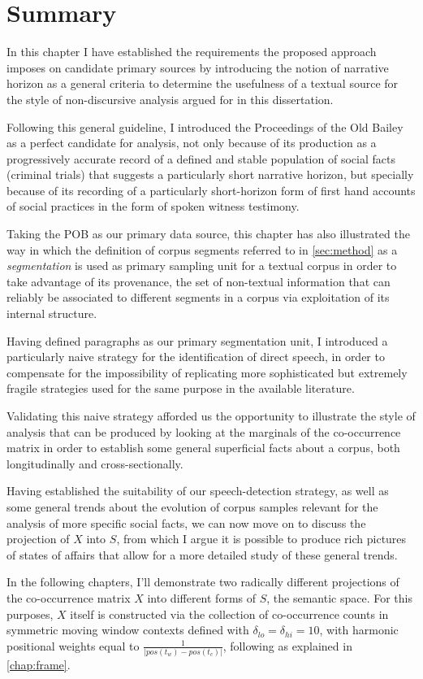 \section{Summary}

In this chapter I have established the requirements the proposed approach imposes on candidate primary sources by introducing the notion of narrative horizon as a general criteria to determine the usefulness of a textual source for the style of non-discursive analysis argued for in this dissertation.

Following this general guideline, I introduced the Proceedings of the Old Bailey as a perfect candidate for analysis, not only because of its production as a progressively accurate record of a defined and stable population of social facts (criminal trials) that suggests a particularly short narrative horizon, but specially because of its recording of a particularly short-horizon form of first hand accounts of social practices in the form of spoken witness testimony.

Taking the POB as our primary data source, this chapter has also illustrated the way in which the definition of corpus segments referred to in \autoref{sec:method} as a \emph{segmentation} is used as primary sampling unit for a textual corpus in order to take advantage of its provenance, the set of non-textual information that can reliably be associated to different segments in a corpus via exploitation of its internal structure.

Having defined paragraphs as our primary segmentation unit, I introduced a particularly naive strategy for the identification of direct speech, in order to compensate for the impossibility of replicating more sophisticated but extremely fragile strategies used for the same purpose in the available literature.

Validating this naive strategy afforded us the opportunity to illustrate the style of analysis that can be produced by looking at the marginals of the co-occurrence matrix in order to establish some general superficial facts about a corpus, both longitudinally and cross-sectionally.

Having established the suitability of our speech-detection strategy, as well as some general trends about the evolution of corpus samples relevant for the analysis of more specific social facts, we can now move on to discuss the projection of $X$ into $S$, from which I argue it is possible to produce rich pictures of states of affairs that allow for a more detailed study of these general trends.

In the following chapters, I'll demonstrate two radically different projections of the co-occurrence matrix $X$ into different forms of $S$, the semantic space.
For this purposes, $X$ itself is constructed via the collection of co-occurrence counts in symmetric moving window contexts defined with $\delta_{lo} = \delta_{hi} = 10$, with harmonic positional weights equal to $\frac{1}{|pos( t_w ) - pos( t_c )|}$, following \citet{pennington2014} as explained in \autoref{chap:frame}.
